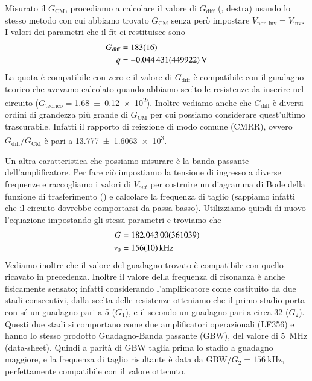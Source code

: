 \documentclass[
    rmp,
    reprint, 
    superscriptaddress, 
    altaffilletter, 
    amsmath, 
    amssymb,
    a4paper]{revtex4-2}
\begin{document}
Misurato il $G_{\text{CM}}$, procediamo a calcolare il valore di $G_{\text{diff}}$ (, destra) usando lo stesso metodo con cui abbiamo trovato $G_{\text{CM}}$ senza però impostare $V_{\text{non-inv}}=V_{\text{inv}}$. I valori dei parametri che il fit ci restituisce sono
\begin{align*}
    G_{\text{diff}} &=\num[round-mode=none]{183+-16} \\
    q &=\SI{-0.044431+-0.449922}{\volt} \\
\end{align*}
La quota è compatibile con zero e il valore di $G_{\text{diff}}$ è compatibile con il guadagno teorico che avevamo calcolato quando abbiamo scelto le resistenze da inserire nel circuito ($G_{\text{teorico}}=$\num{1.68 +- 0.12e2}). Inoltre vediamo anche che $G_{\text{diff}}$ è diversi ordini di grandezza più grande di $G_{\text{CM}}$ per cui possiamo considerare quest'ultimo trascurabile. Infatti il rapporto di reiezione di modo comune (CMRR), ovvero $G_{\text{diff}}/G_{\text{CM}}$ è pari a \num{13.777+-1.6063e3}.

Un altra caratteristica che possiamo misurare è la banda passante dell'amplificatore. Per fare ciò impostiamo la tensione di ingresso a diverse frequenze e raccogliamo i valori di $V_{out}$ per costruire un diagramma di Bode della funzione di trasferimento () e calcolare la frequenza di taglio (sappiamo infatti che il circuito dovrebbe comportarsi da passa-basso). Utilizziamo quindi di nuovo l'equazione  impostando gli stessi parametri e troviamo che 
\begin{align*}
    G     &=\num{ 182.043 +-  3.61039} \\
    \nu_0 &=\SI[round-mode=none]{ 156 +-  10}{\kilo\hertz} \\ 
\end{align*}
Vediamo inoltre che il valore del guadagno trovato è compatibile con quello ricavato in precedenza. 
Inoltre il valore della frequenza di risonanza è anche fisicamente sensato; infatti considerando l'amplificatore come costituito da due stadi consecutivi, dalla scelta delle resistenze otteniamo che il primo stadio porta con sé un guadagno pari a 5 ($G_{1}$), e il secondo un guadagno pari a circa 32 ($G_{2}$). Questi due stadi si comportano come due amplificatori operazionali (LF356) e hanno lo stesso prodotto Guadagno-Banda passante (GBW), del valore di \SI{5}{\mega\hertz} (data-sheet). Quindi a parità di GBW taglia prima lo stadio a guadagno maggiore, e la frequenza di taglio risultante è data da $\text{GBW}/G_{2} = \SI{156}{\kilo\hertz}$, perfettamente compatibile con il valore ottenuto.
\end{document}
